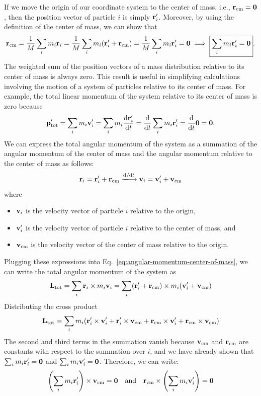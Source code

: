 \documentclass[12pt]{article}
\begin{document}
If we move the origin of our coordinate system to the center of mass, i.e., $\vb{r}_{\text{cm}} = \vb{0}$, then the position vector of particle $i$ is simply $\vb{r}_i'$. Moreover, by using the definition of the center of mass, we can show that
\[
    \vb{r}_{\text{cm}} = \frac{1}{M} \sum_i m_i \vb{r}_i = \frac{1}{M} \sum_i m_i (\vb{r}_i' + \vb{r}_{\text{cm}}) = \frac{1}{M} \sum_i m_i \vb{r}_i' = \vb{0} \implies \boxed{\sum_i m_i \vb{r}_i' = \vb{0}}.
\]
The weighted sum of the position vectors of a mass distribution relative to its center of mass is always zero. This result is useful in simplifying calculations involving the motion of a system of particles relative to its center of mass. For example, the total linear momentum of the system relative to its center of mass is zero because
\[
    \vb{p}_{\text{tot}}' = \sum_i m_i \vb{v}_i' = \sum_i m_i \dv{\vb{r}_i'}{t} = \dv{t} \sum_i m_i \vb{r}_i' = \dv{t} \vb{0} = \vb{0}.
\]
We can express the total angular momentum of the system as a summation of the angular momentum of the center of mass and the angular momentum relative to the center of mass as follows:
\[
\vb{r}_i= \vb{r}'_i + \vb{r}_\text{cm} \xlongrightarrow{\dd/\dd t} \vb{v}_i= \vb{v}'_i + \vb{v}_\text{cm}
\]
where
\begin{itemize}
    \item $\vb{v}_i$ is the velocity vector of particle $i$ relative to the origin,
    \item $\vb{v}_i'$ is the velocity vector of particle $i$ relative to the center of mass, and
    \item $\vb{v}_{\text{cm}}$ is the velocity vector of the center of mass relative to the origin.
\end{itemize}
Plugging these expressions into Eq.~\eqref{eq:angular-momentum-center-of-mass}, we can write the total angular momentum of the system as
\[
    \vb{L}_{\text{tot}} = \sum_i \vb{r}_i \times m_i \vb{v}_i = \sum_i (\vb{r}_i' + \vb{r}_{\text{cm}}) \times m_i (\vb{v}_i' + \vb{v}_{\text{cm}})
\]
Distributing the cross product
\[
    \vb{L}_{\text{tot}} = \sum_i m_i (\vb{r}_i' \times \vb{v}_i' + \vb{r}_i' \times \vb{v}_{\text{cm}} + \vb{r}_{\text{cm}} \times \vb{v}_i' + \vb{r}_{\text{cm}} \times \vb{v}_{\text{cm}})
\]
The second and third terms in the summation vanish because $\vb{v}_{\text{cm}}$ and $\vb{r}_{\text{cm}}$ are constants with respect to the summation over $i$, and we have already shown that $\sum_i m_i \vb{r}_i' = \vb{0}$ and $\sum_i m_i \vb{v}_i' = \vb{0}$. Therefore, we can write:
\[
    \left(\sum_i m_i \vb{r}_i'\right) \times \vb{v}_{\text{cm}} = \vb{0} \quad\text{and}\quad \vb{r}_{\text{cm}} \times \left(\sum_i m_i \vb{v}_i'\right) = \vb{0}
\]
\end{document}
